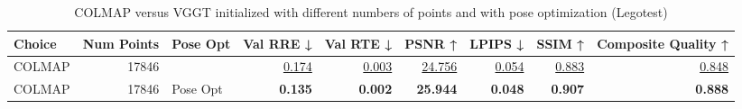 \begin{table}[H]
\caption{COLMAP versus VGGT initialized with different numbers of points and with pose optimization (Legotest)}
\label{tab:02_num_points_pose_opt_legotest}
\begin{tabular}{lrlrrrrrr}
\toprule
Choice & Num Points & Pose Opt & Val RRE ↓ & Val RTE ↓ & PSNR ↑ & LPIPS ↓ & SSIM ↑ & Composite Quality ↑ \\
\midrule
COLMAP & 17846 &  & \underline{0.174} & \underline{0.003} & \underline{24.756} & \underline{0.054} & \underline{0.883} & \underline{0.848} \\
COLMAP & 17846 & Pose Opt & \textbf{0.135} & \textbf{0.002} & \textbf{25.944} & \textbf{0.048} & \textbf{0.907} & \textbf{0.888} \\
\bottomrule
\end{tabular}
\end{table}
